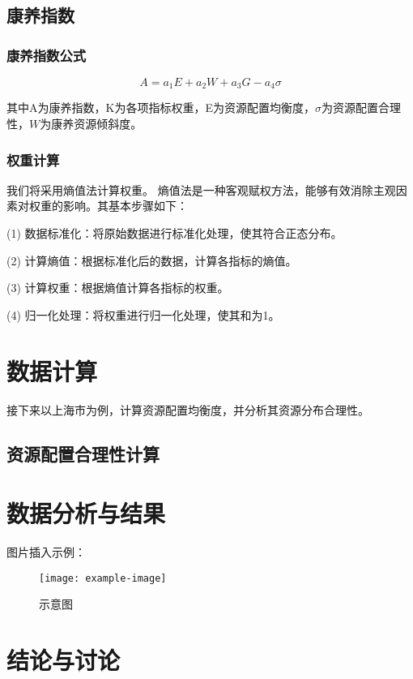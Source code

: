 \documentclass[12pt,a4paper]{article}
\begin{document}
\begin{multicols}{2}
\subsection{康养指数}

\subsubsection{康养指数公式}

\[
A = a_1E + a_2W + a_3G - a_4\sigma
\]

其中A为康养指数，K为各项指标权重，E为资源配置均衡度，$\sigma$为资源配置合理性，$W$为康养资源倾斜度。

\subsubsection{权重计算}

我们将采用熵值法\cite{02}计算权重。
熵值法是一种客观赋权方法，能够有效消除主观因素对权重的影响。其基本步骤如下：

(1) 数据标准化：将原始数据进行标准化处理，使其符合正态分布。

(2) 计算熵值：根据标准化后的数据，计算各指标的熵值。

(3) 计算权重：根据熵值计算各指标的权重。

(4) 归一化处理：将权重进行归一化处理，使其和为1。

\section{数据计算}

接下来以上海市为例，计算资源配置均衡度，并分析其资源分布合理性。
\subsection{资源配置合理性计算}



\section{数据分析与结果}
图片插入示例：
\begin{figure}[h]
    \centering
    \texttt{[image: example-image]} %
    \caption{示意图}
\end{figure}

\section{结论与讨论}

\end{multicols}
\newpage
\end{document}
